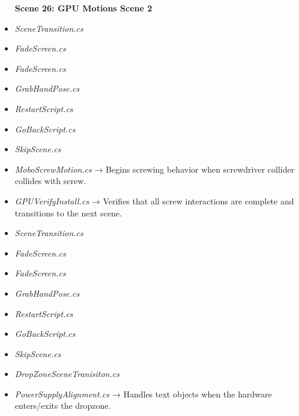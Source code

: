 \documentclass[10pt,twocolumn]{article}
\begin{document}
\begin{itemize}
    \textbf{Scene 26:  GPU Motions Scene 2}\\
    \item \textit{SceneTransition.cs}\\
    \item \textit{FadeScreen.cs}
\end{itemize}

\begin{itemize}
    \textbf{Scene 27:  GPU Install Scene 2}\\
    \item \textit{FadeScreen.cs}\\
    \item \textit{GrabHandPose.cs}\\
    \item \textit{RestartScript.cs}\\
    \item \textit{GoBackScript.cs}\\
    \item \textit{SkipScene.cs}\\
    \item \textit{MoboScrewMotion.cs} → Begins screwing behavior when screwdriver collider collides with screw.\\
    \item \textit{GPUVerifyInstall.cs} → Verifies that all screw interactions are complete and transitions to the next scene. 
\end{itemize}

\begin{itemize}
    \textbf{Scene 28: Power Supply Informational Scene}\\
    \item \textit{SceneTransition.cs}\\
    \item \textit{FadeScreen.cs}
\end{itemize}

\begin{itemize}
    \textbf{Scene 29:  Power Supply Placement Scene }\\
    \item \textit{FadeScreen.cs}\\
    \item \textit{GrabHandPose.cs}\\
    \item \textit{RestartScript.cs}\\
    \item \textit{GoBackScript.cs}\\
    \item \textit{SkipScene.cs}\\
    \item \textit{DropZoneSceneTranisiton.cs}\\
    \item \textit{PowerSupplyAlignment.cs} → Handles text objects when the hardware enters/exits the dropzone. 
\end{itemize}
\end{document}

